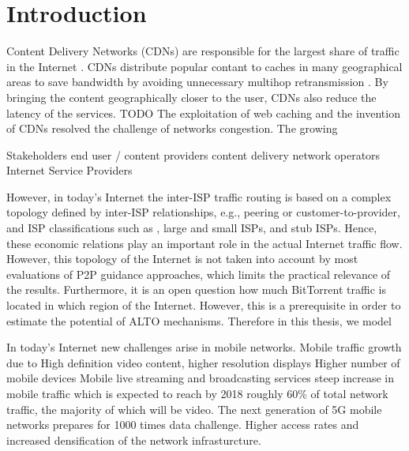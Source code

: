\chapter{Introduction}\label{chap:introduction}

Content Delivery Networks (CDNs) are responsible for the largest share of traffic in the Internet \cite{}.
CDNs distribute popular contant to caches in many geographical areas to save bandwidth by avoiding unnecessary multihop retransmission \cite{}.
By bringing the content geographically closer to the user, CDNs also reduce the latency of the services.
TODO The exploitation of web caching and the invention of CDNs resolved the challenge of networks congestion.
The growing

Stakeholders
end user / content providers
content delivery network operators
Internet Service Providers

However, in today's Internet the inter-ISP traffic routing is based on a complex topology defined by inter-ISP relationships, e.g., peering or customer-to-provider, and ISP classifications such as \tier, large and small ISPs, and stub ISPs. Hence, these economic relations play an important role in the actual Internet traffic flow. However, this topology of the Internet is not taken into account by most evaluations of P2P guidance approaches, which limits the practical relevance of the results. Furthermore, it is an open question how much BitTorrent traffic is located in which region of the Internet. However, this is a prerequisite in order to estimate the potential of ALTO mechanisms.
Therefore in this thesis, we model

In today's Internet new challenges arise in mobile networks.
Mobile traffic growth due to
High definition video content, higher resolution displays
Higher number of mobile devices
Mobile live streaming and broadcasting services
steep increase in mobile traffic \cite{} which is expected to reach by 2018 roughly 60\% of total network traffic, the majority of which will be video.
The next generation of 5G mobile networks prepares for 1000 times data challenge.
Higher access rates and increased densification of the network infrasturcture.


